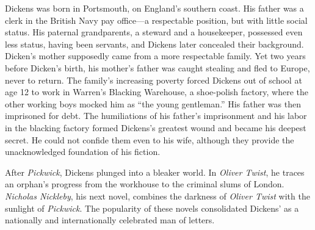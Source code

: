 \begin{listmatch}
\item 
Dickens was born in Portsmouth, on England's southern coast. His
father was a clerk in the British Navy pay office---a respectable
position, but with little social status. His paternal grandparents, a
steward and a housekeeper, possessed even less status, having been
servants, and Dickens later concealed their background. Dicken's mother
supposedly came from a more respectable family. Yet two years before
Dicken's birth, his mother's father was caught stealing and fled to
Europe, never to return. The family's increasing poverty forced Dickens
out of school at age 12 to work in Warren's Blacking Warehouse, a
shoe-polish factory, where the other working boys mocked him as ``the
young gentleman.'' His father was then imprisoned for debt. The
humiliations of his father's imprisonment and his labor in the blacking
factory formed Dickens's greatest wound and became his deepest secret.
He could not confide them even to his wife, although they provide the
unacknowledged foundation of his fiction.


\item 
After \emph{Pickwick}, Dickens plunged into a bleaker world. In
\emph{Oliver Twist}, he traces an orphan's progress from the workhouse
to the criminal slums of London. \emph{Nicholas Nickleby}, his next
novel, combines the darkness of \emph{Oliver Twist} with the sunlight of
\emph{Pickwick}. The popularity of these novels consolidated Dickens' as
a nationally and internationally celebrated man of letters.



\end{listmatch}



